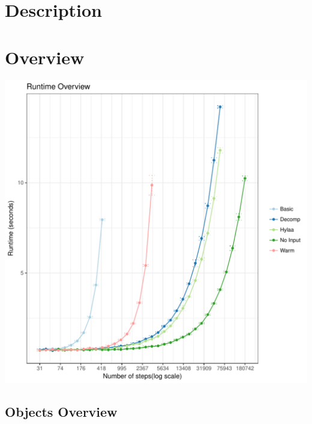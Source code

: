 \documentclass{article}\usepackage[]{graphicx}\usepackage[]{color}
\makeatletter
\def\maxwidth{ %
  \ifdim\Gin@nat@width>\linewidth
    \linewidth
  \else
    \Gin@nat@width
  \fi
}
\newenvironment{knitrout}{}{} %
\makeatother
\begin{document}
\title{}
\author{}
\maketitle




\section{Description}



\section{Overview}


\begin{knitrout}
\color{fgcolor}
\includegraphics[width=\maxwidth]{figure/overview_time-1} 

\end{knitrout}



\subsection{Objects Overview}
\end{document}
